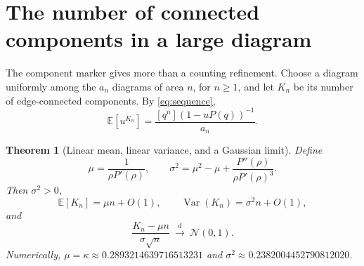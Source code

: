 \documentclass[11pt,letterpaper]{article}
\numberwithin{equation}{section}
\newtheorem{theorem}{Theorem}[section]
\theoremstyle{definition}
\newcommand{\E}{\mathbb E}
\newcommand{\Var}{\operatorname{Var}}
\begin{document}
\section{The number of connected components in a large diagram}
\label{sec:componentsCLT}

The component marker gives more than a counting refinement. Choose a
diagram uniformly among the $a_n$ diagrams of area $n$, for $n\ge1$, and
let $K_n$ be its number of edge-connected components. By
\eqref{eq:sequence},
\begin{equation}
 \E[u^{K_n}]=\frac{[q^n](1-uP(q))^{-1}}{a_n}.
 \label{eq:componentPGF}
\end{equation}

\begin{theorem}[Linear mean, linear variance, and a Gaussian limit]
\label{thm:CLT}
Define
\begin{equation}
 \mu=\frac{1}{\rho P'(\rho)},\qquad
 \sigma^2=\mu^2-\mu+\frac{P''(\rho)}{\rho P'(\rho)^3}.
 \label{eq:CLTconstants}
\end{equation}
Then $\sigma^2>0$,
\begin{equation}
 \E[K_n]=\mu n+O(1),\qquad
 \Var(K_n)=\sigma^2n+O(1),
 \label{eq:CLTmoments}
\end{equation}
and
\begin{equation}
 \frac{K_n-\mu n}{\sigma\sqrt n}
 \ \xrightarrow{\ d\ }\ \mathcal N(0,1).
 \label{eq:CLT}
\end{equation}
Numerically, $\mu=\kappa\approx0.2893214639716513231$ and
$\sigma^2\approx0.2382004452790812020$.
\end{theorem}
\end{document}
